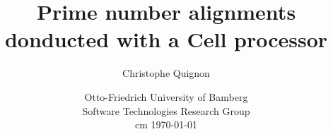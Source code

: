 \documentclass[a4paper]{article}
\begin{document}
\title{%
	Prime number alignments donducted with a Cell processor}
\author{Christophe Quignon}
\date{Otto-Friedrich University of Bamberg\\
Software Technologies Research Group\\
 cm	
\today}

\maketitle


\noindent

\newpage
\tableofcontents
\newpage






%
\newpage




   
\end{document}
